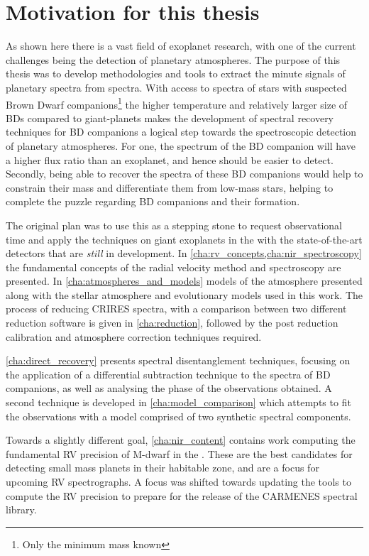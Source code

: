 \section{Motivation for this thesis}
\label{sec:thesis_motivation}

As shown here there is a vast field of exoplanet research, with one of the current challenges being the detection of planetary atmospheres.
The purpose of this thesis was to develop methodologies and tools to extract the minute signals of planetary spectra from \nir{} spectra.
With access to \nir{} spectra of stars with suspected Brown Dwarf companions\footnote{Only the minimum mass \Mtwosini known} the higher temperature and relatively larger size of BDs compared to giant-planets makes the development of spectral recovery techniques for BD companions a logical step towards the spectroscopic detection of planetary atmospheres.
For one, the spectrum of the BD companion will have a higher flux ratio than an exoplanet, and hence should be easier to detect.
Secondly, being able to recover the spectra of these BD companions would help to constrain their mass and differentiate them from low-mass stars, helping to complete the puzzle regarding BD companions and their formation.

The original plan was to use this as a stepping stone to request observational time and apply the techniques on giant exoplanets in the \nir{} with the state-of-the-art detectors that are \emph{still} in development.
In \cref{cha:rv_concepts,cha:nir_spectroscopy} the fundamental concepts of the radial velocity method and \nir{} spectroscopy are presented. In \cref{cha:atmospheres_and_models} models of the atmosphere presented along with the stellar atmosphere and evolutionary models used in this work.
The process of reducing \nir{} {CRIRES} spectra, with a comparison between two different reduction software is given in \cref{cha:reduction}, followed by the post reduction calibration and atmosphere correction techniques required.

\cref{cha:direct_recovery} presents spectral disentanglement techniques, focusing on the application of a differential subtraction technique to the \nir{} spectra of BD companions, as well as analysing the phase of the observations obtained.
A second technique is developed in \cref{cha:model_comparison} which attempts to fit the observations with a model comprised of two synthetic spectral components.

Towards a slightly different goal, \cref{cha:nir_content} contains work computing the fundamental RV precision of {M-dwarf} in the \nir{}.
These are the best candidates for detecting small mass planets in their habitable zone, and are a focus for upcoming \nir{} RV spectrographs.
A focus was shifted towards updating the tools to compute the RV precision to prepare for the release of the {CARMENES} \nir{} spectral library.
